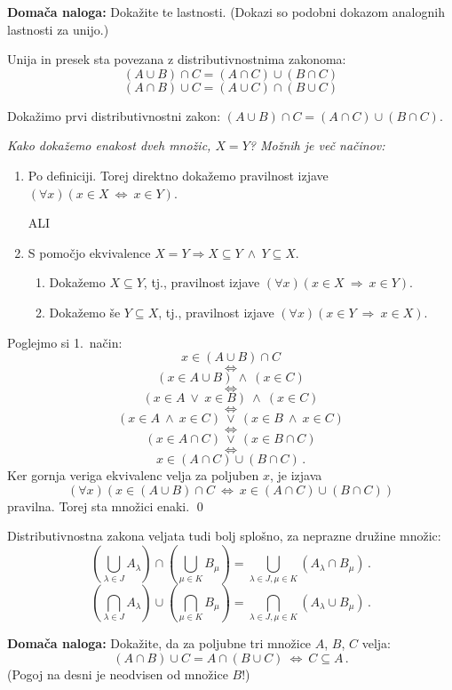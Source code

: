 \documentclass[11pt,paper=b5,footinclude,headinclude]{scrbook} %
\def\ali {{~\vee~}}
\def\inn {{~\wedge~}}
\def\sledi {{~\Rightarrow~}}
\def\cee {{~\Leftrightarrow~}}
\begin{document}
\bigskip
\textbf{ Domača naloga:} Dokažite te lastnosti. (Dokazi so podobni dokazom analognih lastnosti za unijo.)

\bigskip
Unija in presek sta povezana z distributivnostnima zakonoma:
$$(A\cup B)\cap C = (A\cap C)\cup (B\cap C)$$
$$(A\cap B)\cup C = (A\cup C)\cap (B\cup C)$$

Dokažimo prvi distributivnostni zakon:
$(A\cup B)\cap C = (A\cap C)\cup (B\cap C)$.

{\em Kako dokažemo enakost dveh množic, $X = Y$? Možnih je več načinov:
\begin{enumerate}
 \item Po definiciji. Torej
    direktno dokažemo pravilnost izjave $(\forall x)(x\in X\cee x\in Y)$.

    ALI

\item  S pomočjo ekvivalence $X = Y \Longrightarrow X\subseteq Y \inn Y\subseteq X$.
\begin{enumerate}
         \item   Dokažemo $X\subseteq Y$, tj., pravilnost izjave $(\forall x)(x\in X\sledi x\in Y)$.
 \item Dokažemo še $Y\subseteq X$, tj., pravilnost izjave $(\forall x)(x\in Y\sledi x\in X)$.
        \end{enumerate}
        \end{enumerate}}

Poglejmo si 1.~način:
$$x\in (A\cup B)\cap C$$
$$\cee$$
$$(x\in A\cup B) \inn (x\in C)$$
$$\cee$$
$$(x\in A\ali x\in B) \inn (x\in C)$$
$$\cee$$
$$(x\in A \inn  x\in C)\ali (x\in B \inn  x\in C) $$
$$\cee$$
$$(x\in A \cap C)\ali (x\in B \cap C) $$
$$\cee$$
$$x\in (A \cap C)\cup (B \cap C)\,.$$
Ker gornja veriga ekvivalenc velja za poljuben $x$, je izjava
$$(\forall x)(x\in (A\cup B)\cap C\cee x\in (A \cap C)\cup (B \cap C))$$
pravilna. Torej sta množici enaki.
\qed

Distributivnostna zakona veljata tudi bolj splošno, za neprazne družine množic:
$$(\bigcup_{\lambda\in J}A_\lambda)\cap (\bigcup_{\mu\in K}B_\mu) =
\bigcup_{\lambda\in J, \mu\in K}(A_\lambda\cap B_\mu)\,.$$
$$(\bigcap_{\lambda\in J}A_\lambda)\cup (\bigcap_{\mu\in K}B_\mu) =
\bigcap_{\lambda\in J, \mu\in K}(A_\lambda\cup B_\mu)\,.$$

\medskip
\textbf{ Domača naloga:} Dokažite, da za poljubne tri množice $A$, $B$, $C$ velja:
$$(A\cap B)\cup C = A\cap (B\cup C) \cee C\subseteq A\,.$$
(Pogoj na desni je neodvisen od množice $B$!)

%
%
%
%
%
%
\bigskip
\end{document}
